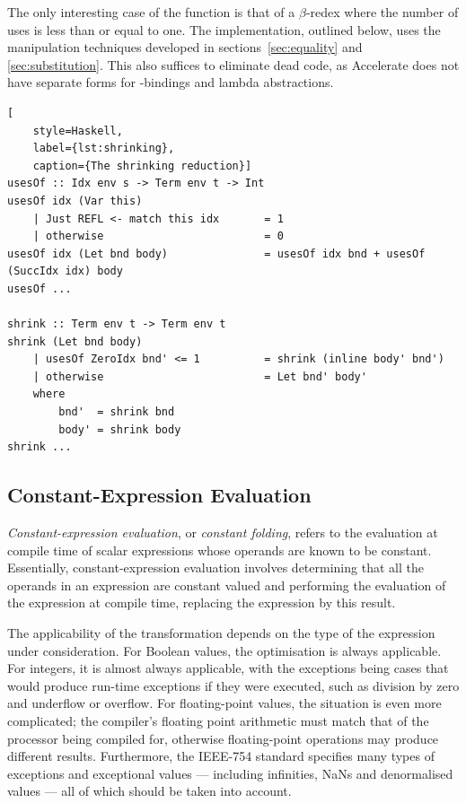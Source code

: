The only interesting case of the  function is that of a
$\beta$-redex where the number of uses is less than or equal to one. The
implementation, outlined below, uses the  manipulation
techniques developed in sections~\ref{sec:equality} and \ref{sec:substitution}.
This also suffices to eliminate dead code, as Accelerate does not have separate
forms for -bindings and lambda abstractions.
%
\begin{lstlisting}[
    style=Haskell,
    label={lst:shrinking},
    caption={The shrinking reduction}]
usesOf :: Idx env s -> Term env t -> Int
usesOf idx (Var this)
    | Just REFL <- match this idx       = 1
    | otherwise                         = 0
usesOf idx (Let bnd body)               = usesOf idx bnd + usesOf (SuccIdx idx) body
usesOf ...

shrink :: Term env t -> Term env t
shrink (Let bnd body)
    | usesOf ZeroIdx bnd' <= 1          = shrink (inline body' bnd')
    | otherwise                         = Let bnd' body'
    where
        bnd'  = shrink bnd
        body' = shrink body
shrink ...
\end{lstlisting}


\subsection{Constant-Expression Evaluation}

\emph{Constant-expression evaluation}, or \emph{constant folding}, refers to the
evaluation at compile time of scalar expressions whose operands are known to be
constant. Essentially, constant-expression evaluation involves determining that
all the operands in an expression are constant valued and performing the
evaluation of the expression at compile time, replacing the expression by this
result.

The applicability of the transformation depends on the type of the expression
under consideration. For Boolean values, the optimisation is always applicable.
For integers, it is almost always applicable, with the exceptions being cases
that would produce run-time exceptions if they were executed, such as division
by zero and underflow or overflow. For floating-point values, the situation is
even more complicated; the compiler's floating point arithmetic must match that
of the processor being compiled for, otherwise floating-point operations may
produce different results. Furthermore, the IEEE-754 standard specifies many
types of exceptions and exceptional values --- including infinities, NaNs and
denormalised values --- all of which should be taken into account.


